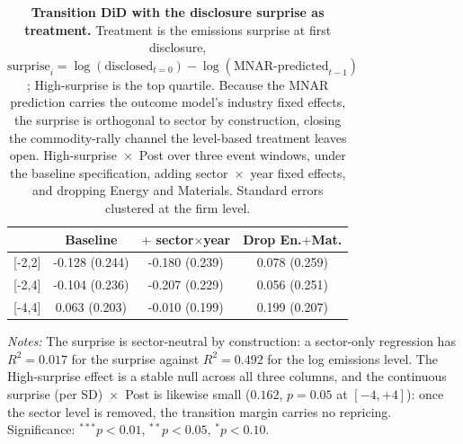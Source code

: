 \documentclass[a4paper,12pt]{article}
\begin{document}
\begin{table}[htbp]
\footnotesize\centering
\caption{\textbf{Transition DiD with the disclosure surprise as treatment.}
Treatment is the emissions surprise at first disclosure,
$\text{surprise}_i=\log(\text{disclosed}_{t=0})-\log(\text{MNAR-predicted}_{t-1})$;
High-surprise is the top quartile. Because the MNAR prediction carries the outcome
model's industry fixed effects, the surprise is orthogonal to sector by
construction, closing the commodity-rally channel the level-based treatment leaves
open. High-surprise~$\times$~Post over three event windows, under the baseline
specification, adding sector~$\times$~year fixed effects, and dropping Energy and
Materials. Standard errors clustered at the firm level.}
\label{tab:returns_did_surprise}
\begin{tabular}{lccc}
\toprule
 & Baseline & $+$ sector$\times$year & Drop En.$+$Mat. \\
\midrule
{[-2,2]} & -0.128 (0.244) & -0.180 (0.239) & 0.078 (0.259) \\
{[-2,4]} & -0.104 (0.236) & -0.207 (0.229) & 0.056 (0.251) \\
{[-4,4]} & 0.063 (0.203) & -0.010 (0.199) & 0.199 (0.207) \\
\bottomrule
\end{tabular}
\begin{flushleft}\footnotesize
\textit{Notes:} The surprise is sector-neutral by construction: a sector-only regression has $R^2=0.017$ for the surprise against $R^2=0.492$ for the log emissions level. The High-surprise effect is a stable null across all three columns, and the continuous surprise (per SD)~$\times$~Post is likewise small ($0.162$, $p=0.05$ at $[-4,+4]$): once the sector level is removed, the transition margin carries no repricing. Significance: $^{***}p<0.01$, $^{**}p<0.05$, $^{*}p<0.10$.
\end{flushleft}
\end{table}
\end{document}
